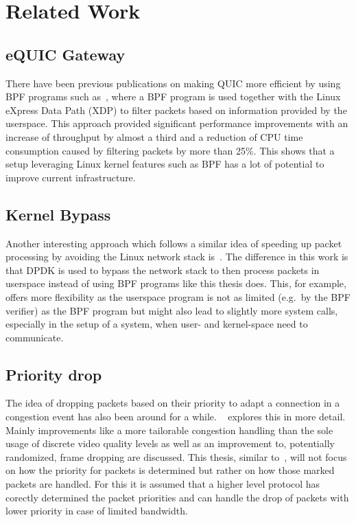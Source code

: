 \section{Related Work}\label{sec:related_work}

\subsection{eQUIC Gateway}
There have been previous publications on making QUIC more efficient by using BPF programs
such as~\parencite{equic-gateway}, where a BPF program is used together with the Linux
eXpress Data Path (XDP) to filter packets based on information provided by the userspace.
This approach provided significant performance improvements with an increase of throughput
by almost a third and a reduction of CPU time consumption caused by filtering packets by
more than 25\%.
This shows that a setup leveraging Linux kernel features such as BPF has a lot of potential
to improve current infrastructure.

\subsection{Kernel Bypass}
Another interesting approach which follows a similar idea of speeding up packet processing
by avoiding the Linux network stack is~\parencite{kernel-bypass-msc-thesis}.
The difference in this work is that DPDK is used to bypass the network stack to 
then process packets in userspace instead of using BPF programs like this thesis does.
This, for example, offers more flexibility as the userspace program is not as limited (e.g.\ 
by the BPF verifier) as the BPF program but might also lead to slightly more system calls,
especially in the setup of a system, when user- and kernel-space need to communicate.

\subsection{Priority drop}
The idea of dropping packets based on their priority to adapt a connection
in a congestion event has also been around for a while.
~\parencite{media-streaming-prio-drop} explores this in more detail.
Mainly improvements like a more tailorable congestion handling than the sole usage
of discrete video quality levels as well as an improvement to, potentially 
randomized, frame dropping are discussed.
This thesis, similar to~\parencite{media-streaming-prio-drop}, will not focus
on how the priority for packets is determined but rather on how those marked
packets are handled.
For this it is assumed that a higher level protocol has corectly determined 
the packet priorities and can handle the drop of packets with lower priority
in case of limited bandwidth.
